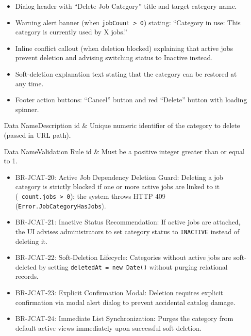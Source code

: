 \begin{itemize}[leftmargin=1.6em,topsep=3pt,itemsep=2pt,parsep=0pt,label=$\bullet$]
    \item Dialog header with ``Delete Job Category'' title and target category name.
    \item Warning alert banner (when \texttt{jobCount > 0}) stating: ``Category in use: This category is currently used by X jobs.''
    \item Inline conflict callout (when deletion blocked) explaining that active jobs prevent deletion and advising switching status to Inactive instead.
    \item Soft-deletion explanation text stating that the category can be restored at any time.
    \item Footer action buttons: ``Cancel'' button and red ``Delete'' button with loading spinner.
\end{itemize}


\begin{specdatatable}{Data Name}{Description}
id & Unique numeric identifier of the category to delete (passed in URL path).\\ \hline
\end{specdatatable}

\begin{specdatatable}{Data Name}{Validation Rule}
id & Must be a positive integer greater than or equal to 1.\\ \hline
\end{specdatatable}

\begin{itemize}[leftmargin=1.6em,topsep=3pt,itemsep=2pt,parsep=0pt,label=$\bullet$]\brrulelist
    \item BR-JCAT-20: Active Job Dependency Deletion Guard: Deleting a job category is strictly blocked if one or more active jobs are linked to it (\texttt{\_count.jobs > 0}); the system throws HTTP 409 (\texttt{Error.JobCategoryHasJobs}).
    \item BR-JCAT-21: Inactive Status Recommendation: If active jobs are attached, the UI advises administrators to set category status to \texttt{INACTIVE} instead of deleting it.
    \item BR-JCAT-22: Soft-Deletion Lifecycle: Categories without active jobs are soft-deleted by setting \texttt{deletedAt = new Date()} without purging relational records.
    \item BR-JCAT-23: Explicit Confirmation Modal: Deletion requires explicit confirmation via modal alert dialog to prevent accidental catalog damage.
    \item BR-JCAT-24: Immediate List Synchronization: Purges the category from default active views immediately upon successful soft deletion.
\end{itemize}

